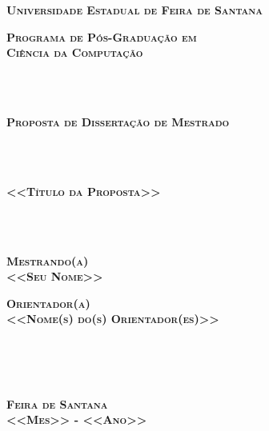 \documentclass[a4paper,titlepage,12pt]{article}
\begin{document}

\pagestyle{empty}

\begin{center}
{\textbf{\Large \textsc{Universidade Estadual de Feira de Santana}}}
\end{center}

\begin{center}
{\Large \textsc{\textbf{Programa de Pós-Graduação em \\Ciência da Computação}}}
\end{center}

~\\ \\

\begin{center}
{\LARGE \textsc{\textbf{Proposta de Dissertação de Mestrado}}}
\end{center}

~\\ \\

\begin{center}
{\Large \textsc{\textbf{<<Título da Proposta>>}}}
\end{center}

~\\ \\

\begin{center}
\textbf{\textsc{Mestrando(a)} \\
\textsc{<<Seu Nome>>}}
\end{center}

\begin{center}
\textbf{\textsc{Orientador(a)} \\
\textsc{<<Nome(s) do(s) Orientador(es)>>}}
\end{center}

~\\ \\ \\

\begin{center}
\textbf{{\large \textsc{Feira de Santana}}
\\
{\large \textsc{<<Mes>> - <<Ano>>}}}
\end{center}

\newpage
\cleardoublepage

\end{document}
